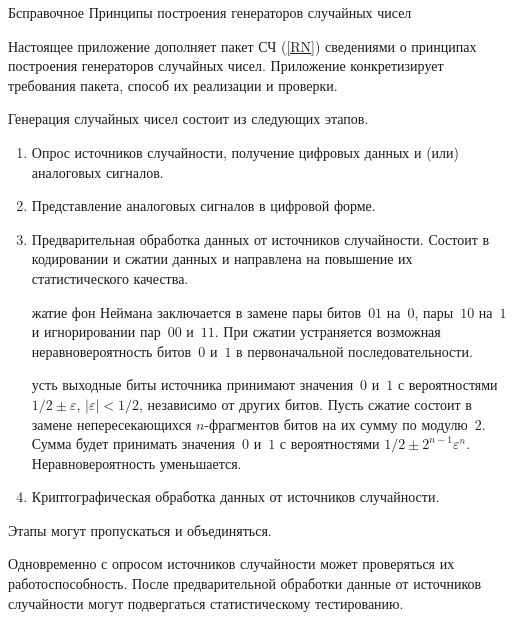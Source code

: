 \begin{appendix}{Б}{справочное}
{Принципы построения генераторов случайных чисел}
\label{RNG} 

\label{RNG.Intro}

Настоящее приложение дополняет пакет СЧ (\ref{RN})
сведениями о принципах построения генераторов случайных чисел. 
%
Приложение конкретизирует требования пакета, способ их реализации и проверки.

\label{RNG.Design}

Генерация случайных чисел состоит из следующих этапов.

\begin{enumerate}
\item
Опрос источников случайности,
получение цифровых данных и (или) аналоговых сигналов.

\item
Представление аналоговых сигналов в цифровой форме.

\item
Предварительная обработка данных от источников случайности. 
Состоит в кодировании и сжатии данных и направлена на повышение их 
статистического качества. 

\begin{examples}
жатие фон Неймана заключается в замене пары битов~$01$ на~$0$, 
пары~$10$ на~$1$ и игнорировании пар~$00$ и~$11$. При сжатии устраняется 
возможная неравновероятность битов~$0$ и~$1$ в первоначальной 
последовательности.

усть выходные биты источника принимают значения~$0$ и~$1$ с 
вероятностями $1/2\pm\varepsilon$, $|\varepsilon|<1/2$, независимо от других 
битов.
%
Пусть сжатие состоит в замене непересекающихся $n$-фрагментов битов на их сумму 
по модулю~$2$. 
%
Сумма будет принимать значения~$0$ и~$1$ с вероятностями
$1/2\pm 2^{n-1}\varepsilon^n$. Неравновероятность уменьшается.
\end{examples}

\item
Криптографическая обработка данных от источников случайности. 
\end{enumerate}

Этапы могут пропускаться и объединяться. 

Одновременно с опросом источников случайности может проверяться их 
работоспособность.
%
После предварительной обработки данные от источников случайности 
могут подвергаться статистическому тестированию. 


\end{appendix}
